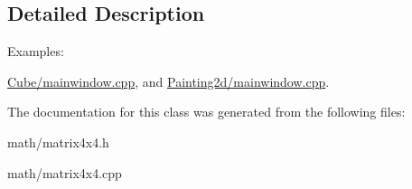 \subsection{Detailed Description}
\begin{Desc}
\item[Examples\+: ]\par
\hyperlink{_cube_2mainwindow_8cpp-example}{Cube/mainwindow.\+cpp}, and \hyperlink{_painting2d_2mainwindow_8cpp-example}{Painting2d/mainwindow.\+cpp}.\end{Desc}


The documentation for this class was generated from the following files\+:\begin{DoxyCompactItemize}
\item 
math/matrix4x4.\+h\item 
math/matrix4x4.\+cpp\end{DoxyCompactItemize}

